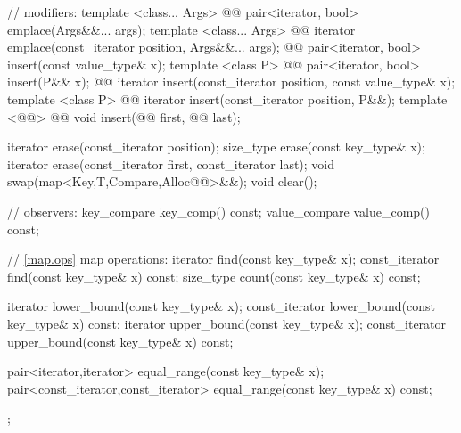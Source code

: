\documentclass[american,twoside]{book}
\begin{document}
\begin{codeblock}
{{    // modifiers:
    template <class... Args> 
      @@
      pair<iterator, bool> emplace(Args&&... args);
    template <class... Args> 
      @@
      iterator emplace(const_iterator position, Args&&... args);
    @@ 
      pair<iterator, bool> insert(const value_type& x);
    template <class P> 
      @@
      pair<iterator, bool> insert(P&& x);
    @@ 
      iterator insert(const_iterator position, const value_type& x);
    template <class P>
      @@
      iterator insert(const_iterator position, P&&);
    template <@@>
      @@
      void insert(@@ first, @@ last);

    iterator  erase(const_iterator position);
    size_type erase(const key_type& x);
    iterator  erase(const_iterator first, const_iterator last);
    void swap(map<Key,T,Compare,Alloc@@>&&);
    void clear();

    // observers:
    key_compare   key_comp() const;
    value_compare value_comp() const;

    // \ref{map.ops} map operations:
    iterator       find(const key_type& x);
    const_iterator find(const key_type& x) const;
    size_type      count(const key_type& x) const;

    iterator       lower_bound(const key_type& x);
    const_iterator lower_bound(const key_type& x) const;
    iterator       upper_bound(const key_type& x);
    const_iterator upper_bound(const key_type& x) const;

    pair<iterator,iterator>
      equal_range(const key_type& x);
    pair<const_iterator,const_iterator>
      equal_range(const key_type& x) const;
  };

}
\end{codeblock}
\end{document}
